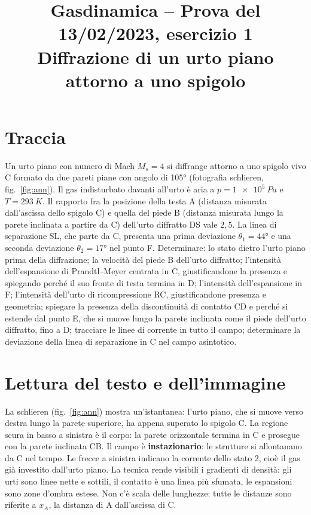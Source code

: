 \documentclass[11pt,a4paper]{article}
\title{Gasdinamica -- Prova del 13/02/2023, esercizio 1\\[2pt]
\large Diffrazione di un urto piano attorno a uno spigolo}
\author{}
\date{}
\newcommand{\Ms}{M_{s}}
\begin{document}
\maketitle

\section*{Traccia}
Un urto piano con numero di Mach $\Ms=4$ si diffrange attorno a uno spigolo vivo C formato da due pareti piane con
angolo di \ang{105} (fotografia schlieren, fig.~\ref{fig:ann}). Il gas indisturbato davanti all'urto è aria a
$p=\SI{1e5}{Pa}$ e $T=\SI{293}{K}$. Il rapporto fra la posizione della testa A (distanza misurata dall'ascissa
dello spigolo C) e quella del piede B (distanza misurata lungo la parete inclinata a partire da C) dell'urto diffratto
DS vale $2{,}5$. La linea di separazione SL, che parte da C, presenta una prima deviazione $\theta_1=\ang{44}$ e una
seconda deviazione $\theta_2=\ang{17}$ nel punto F. Determinare: lo stato dietro l'urto piano prima della
diffrazione; la velocità del piede B dell'urto diffratto; l'intensità dell'espansione di Prandtl--Meyer centrata in C,
giustificandone la presenza e spiegando perché il suo fronte di testa termina in D; l'intensità dell'espansione in F;
l'intensità dell'urto di ricompressione RC, giustificandone presenza e geometria; spiegare la presenza della
discontinuità di contatto CD e perché si estende dal punto E, che si muove lungo la parete inclinata come il piede
dell'urto diffratto, fino a D; tracciare le linee di corrente in tutto il campo; determinare la deviazione della linea di
separazione in C nel campo asintotico.

\section{Lettura del testo e dell'immagine}
La schlieren (fig.~\ref{fig:ann}) mostra un'istantanea: l'urto piano, che si muove verso destra lungo la parete
superiore, ha appena superato lo spigolo C. La regione scura in basso a sinistra è il corpo: la parete orizzontale
termina in C e prosegue con la parete inclinata CB. Il campo è \textbf{instazionario}: le strutture si allontanano da C
nel tempo. Le frecce a sinistra indicano la corrente dello stato 2, cioè il gas già investito dall'urto piano. La
tecnica rende visibili i gradienti di densità: gli urti sono linee nette e sottili, il contatto è una linea più
sfumata, le espansioni sono zone d'ombra estese. Non c'è scala delle lunghezze: tutte le distanze sono riferite a
$x_A$, la distanza di A dall'ascissa di C.
\end{document}
